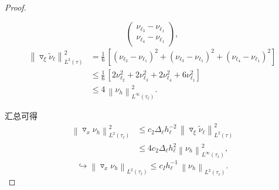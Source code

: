 \begin{proof}
\begin{itemize}
\begin{equation*}
\begin{pmatrix}
      \nu_{\ell_{3}} - \nu_{\ell_{1}} \\
      \nu_{\ell_{4}} - \nu_{\ell_{1}}
    \end{pmatrix},
  \end{equation*}
  \begin{equation*}
    \begin{split}
    \left\| \triangledown_{\xi} \widetilde{\nu}_{\ell} \right\|_{L^{2}(\tau)}^{2}
    & = \frac{1}{6} \,
    \left[
    \left( \nu_{\ell_{2}} - \nu_{\ell_{1}} \right)^{2} +
    \left( \nu_{\ell_{3}} - \nu_{\ell_{1}} \right)^{2} +
    \left( \nu_{\ell_{4}} - \nu_{\ell_{1}} \right)^{2}
    \right] \\
    & \le \frac{1}{6} \,
    \left[
    2 \nu_{\ell_{2}}^{2} + 2 \nu_{\ell_{3}}^{2} + 2 \nu_{\ell_{4}}^{2} + 6 \nu_{\ell_{1}}^{2}
    \right]\\
    & \le 4 \, \left\| \nu_{h} \right\|_{L^{\infty}(\tau_{\ell})}^{2}.
  \end{split}
  \end{equation*}
  \end{itemize}

汇总可得
  \begin{equation*}
    \begin{split}
      \left\| \triangledown_{x} \nu_{h} \right\|_{L^{2}(\tau_{\ell})}^{2}
      & \le c_{2} \Delta_{\ell} h_{\ell}^{-2} \,
      \left\| \triangledown_{\xi} \widetilde{\nu}_{\ell} \right\|_{L^{2}(\tau)}^{2} \\
      & \le 4 c_{2} \Delta_{\ell} h_{\ell}^{2} \left\| \nu_{h} \right\|_{L^{\infty}(\tau_{\ell})}^2,
    \end{split}
  \end{equation*}
\begin{equation*}
  \hookrightarrow \left\| \triangledown_{x} \nu_{h} \right\|_{L^{2}(\tau_{\ell})}
  \le c_{I} h_{\ell}^{-1} \,
  \left\| \nu_{h} \right\|_{L^{2}(\tau_{\ell})}.
\end{equation*}
\end{proof}

